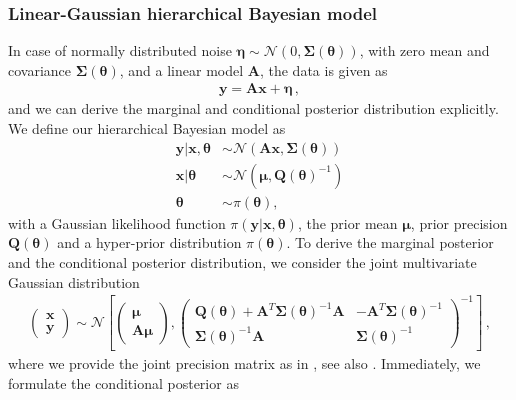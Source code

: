 \subsubsection{Linear-Gaussian hierarchical Bayesian model}
\label{subsec:LinBay}
In case of normally distributed noise $\bm{\eta} \sim \mathcal{N}(0,\bm{\Sigma}(\bm{\theta}))$, with zero mean and covariance $\bm{\Sigma}(\bm{\theta})$, and a linear model $\bm{A}$, the data is given as 
\begin{align}
	\bm{y} = \bm{A} \bm{x} + \bm{\eta} \, ,
	\label{eq:LinDat}
\end{align}
and we can derive the marginal and conditional posterior distribution explicitly.
We define our hierarchical Bayesian model as
\begin{subequations}
	\begin{align}
		\bm{y} |  \bm{x}, \bm{\theta} &\sim \mathcal{N}(\bm{A} \bm{x}, \bm{\Sigma}(\bm{\theta}) ) \\
		\bm{x} |  \bm{\theta} &\sim \mathcal{N}(\bm{\mu}, \bm{Q}(\bm{\theta})^{-1} ) \\
		\bm{\theta} &\sim \pi(\bm{\theta}) ,
	\end{align}
	\label{eq:GenBayMode}
\end{subequations}
with a Gaussian likelihood function $\pi(\bm{y} |  \bm{x}, \bm{\theta} )$, the prior mean $\bm{\mu}$, prior precision $\bm{Q}(\bm{\theta})$ and a hyper-prior distribution $\pi(\bm{\theta})$.
To derive the marginal posterior and the conditional posterior distribution, we consider the joint multivariate Gaussian distribution
\begin{align}
	\begin{pmatrix}
		\bm{x} \\
		\bm{y}
	\end{pmatrix}\sim \mathcal{N}\left[  \begin{pmatrix}
		\bm{\mu} \\
		\bm{A}\bm{\mu}
	\end{pmatrix},\begin{pmatrix}
		\bm{Q}(\bm{\theta}) + \bm{A}^T \bm{\Sigma}(\bm{\theta})^{-1} \bm{A} & - \bm{A}^T \bm{\Sigma}(\bm{\theta})^{-1} \\
		\bm{\Sigma}(\bm{\theta})^{-1} \bm{A} & \bm{\Sigma}(\bm{\theta})^{-1} 
	\end{pmatrix}^{-1} \right] \, ,
\end{align}
where we provide the joint precision matrix as in \cite{SIMPSON201216}, see also \cite{rue2005gaussian, fox2016fast}.
Immediately, we formulate the conditional posterior as 
